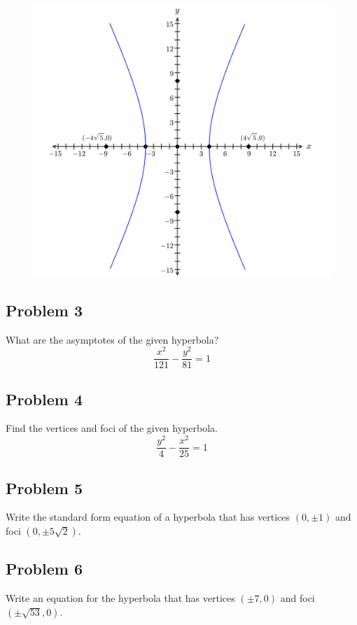 \documentclass[12pt]{article}
\begin{document}
\begin{figure}[!ht]
    \centering
    \includegraphics[width=1\linewidth]{6.1.png}
\end{figure}

\subsection*{Problem 3}
What are the asymptotes of the given hyperbola?
\[\dfrac{x^2}{121}-\dfrac{y^2}{81}=1\]

\subsection*{Problem 4}
Find the vertices and foci of the given hyperbola.
\[\dfrac{y^2}{4}-\dfrac{x^2}{25}=1\]

\subsection*{Problem 5}
Write the standard form equation of a hyperbola that has vertices \((0, \pm 1)\) and foci \((0, \pm 5\sqrt{2})\).

\subsection*{Problem 6}
Write an equation for the hyperbola that has vertices \((\pm 7,0)\) and foci \((\pm \sqrt{53},0)\).
\end{document}
